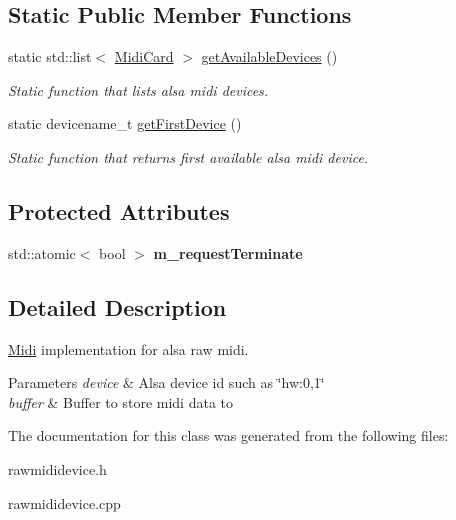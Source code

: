 \subsection*{Static Public Member Functions}
\begin{DoxyCompactItemize}
\item 
static std\+::list$<$ \hyperlink{structNl_1_1MidiCard}{Midi\+Card} $>$ \hyperlink{group__Midi_gaf6f05ac177aed9d05e06f34a776b5317}{get\+Available\+Devices} ()
\begin{DoxyCompactList}\small\item\em Static function that lists alsa midi devices. \end{DoxyCompactList}\item 
static devicename\+\_\+t \hyperlink{group__Midi_ga0b9d06ce7bef2391934e3770c4343b63}{get\+First\+Device} ()
\begin{DoxyCompactList}\small\item\em Static function that returns first available alsa midi device. \end{DoxyCompactList}\end{DoxyCompactItemize}
\subsection*{Protected Attributes}
\begin{DoxyCompactItemize}
\item 
\hypertarget{classNl_1_1RawMidiDevice_a9c773439bde734734607e1f4a39265a0}{}std\+::atomic$<$ bool $>$ {\bfseries m\+\_\+request\+Terminate}\label{classNl_1_1RawMidiDevice_a9c773439bde734734607e1f4a39265a0}

\end{DoxyCompactItemize}


\subsection{Detailed Description}
\hyperlink{classNl_1_1Midi}{Midi} implementation for alsa raw midi. 


\begin{DoxyParams}{Parameters}
{\em device} & Alsa device id such as \char`\"{}hw\+:0,1\char`\"{} \\
\hline
{\em buffer} & Buffer to store midi data to \\
\hline
\end{DoxyParams}


The documentation for this class was generated from the following files\+:\begin{DoxyCompactItemize}
\item 
rawmididevice.\+h\item 
rawmididevice.\+cpp\end{DoxyCompactItemize}
